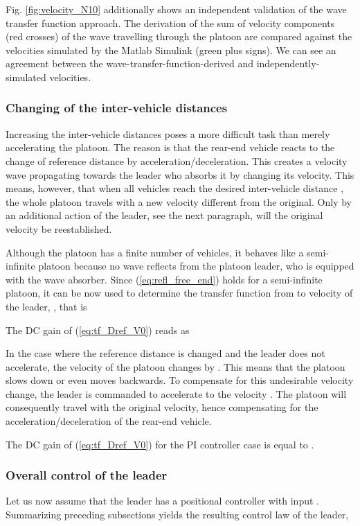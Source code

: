 \documentclass[final,5p,times,twocolumn]{elsarticle}
\begin{document}
Fig. \ref{fig:velocity_N10} additionally shows an independent validation of the wave transfer function approach. The derivation of the sum of  velocity components (red crosses) of the wave travelling through the platoon are compared against the velocities simulated by the Matlab Simulink (green plus signs). We can see an agreement between the wave-transfer-function-derived and independently-simulated velocities.

\subsubsection{Changing of the inter-vehicle distances}
\label{subsec:changing_distances}

Increasing the inter-vehicle distances poses a more difficult task than merely accelerating the platoon. The reason is that the rear-end vehicle reacts to the change of reference distance  by acceleration/deceleration. This creates a velocity wave propagating towards the leader who absorbs it by changing its velocity. This means, however, that when all vehicles reach the desired inter-vehicle distance , the whole platoon travels with a new velocity different from the original. Only by an additional action of the leader, see the next paragraph, will the original velocity be reestablished.

Although the platoon has a finite number of vehicles, it behaves like a semi-infinite platoon because no wave reflects from the platoon leader, who is equipped with the wave absorber. Since (\ref{eq:refl_free_end}) holds for a semi-infinite platoon, it can be now used to determine the transfer function from  to velocity of the leader, , that is

The DC gain of (\ref{eq:tf_Dref_V0}) reads as


In the case where the reference distance is changed and the leader does not accelerate, the velocity of the platoon changes by . This means that the platoon slows down or even moves backwards. To compensate for this undesirable velocity change, the leader is commanded to accelerate to the velocity
. The platoon will consequently travel with the original velocity, hence compensating for the acceleration/deceleration of the rear-end vehicle.

The DC gain of (\ref{eq:tf_Dref_V0}) for the PI controller case is equal to .


\subsubsection{Overall control of the leader}
Let us now assume that the leader has a positional controller with input . Summarizing preceding subsections yields the resulting control law of the leader,
\end{document}
